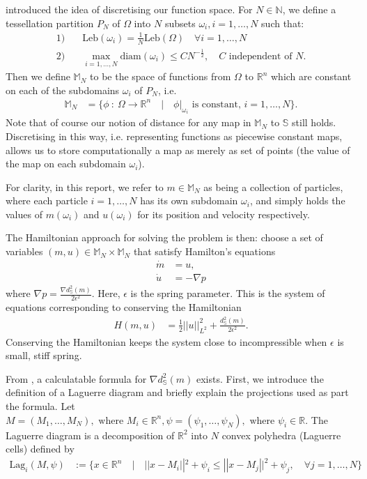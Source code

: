 \documentclass[11pt, oneside]{article}   	%
\newcommand{\R}{\mathbb{R}}
\newcommand{\MN}{\mathbb{M}_N}
\newcommand{\dsmsq}{d^{2}_{\mathbb{S}}(m)}
\newcommand{\graddsmsq}{\nabla{d^{2}_{\mathbb{S}}(m)}}
\newcommand{\N}{\mathbb{N}}
\newcommand{\Sb}{\mathbb{S}}
\newcommand{\Leb}{\mathrm{Leb}}
\begin{document}
\cite{gallouet2016lagrangian} introduced the idea of discretising our function space. For \(N \in \N\), we define a tessellation partition \(P_N\) of \(\Omega\) into \(N\) subsets \(\omega_i, i=1,\dots,N\) such that:
\begin{align}
1)& \quad \Leb(\omega_i) = \frac{1}{N}\Leb(\Omega) \quad \forall i = 1,\dots,N \\
2)& \quad \max_{i = 1,\dots,N} \mathrm{diam}(\omega_i) \le CN^{-\frac{1}{2}}, \quad C \text{ independent of } N.
\end{align}
Then we define \(\MN\) to be the space of functions from \(\Omega\) to \(\R^n\) which are constant on each of the subdomains \(\omega_i\) of \(P_N\), i.e.
\begin{align}
\MN &= \Big\{ \phi \: : \: \Omega \to \R^n \quad | \quad \phi | _{\omega_i} \text{ is constant, } i = 1,\dots,N \Big\}.
\end{align}
Note that of course our notion of distance for any map in \(\MN\) to \(\Sb\) still holds. Discretising in this way, i.e. representing functions as piecewise constant maps, allows us to store computationally a map as merely as set of points (the value of the map on each subdomain \(\omega_i\)).

For clarity, in this report, we refer to \(m \in \MN\)  as being a collection of particles, where each particle \(i=1,\dots,N\) has its own subdomain \(\omega_i\), and simply holds the values of \(m(\omega_i)\) and \(u(\omega_i)\) for its position and velocity respectively.

The Hamiltonian approach for solving the problem is then: choose a set of variables \((m, u) \in \MN \times \MN \) that satisfy Hamilton's equations
\begin{align} 
\dot{m} &= u, \\
\dot{u} &= - \nabla p
\end{align}
where \(\nabla p = \frac{\graddsmsq}{2\epsilon^2}\). Here, \(\epsilon\) is the spring parameter. This is the system of equations corresponding to conserving the Hamiltonian
\begin{align} 
H(m, u) &= \frac{1}{2} ||u||^2_{L^2} + \frac{\dsmsq}{2\epsilon^2}.
\end{align}
Conserving the Hamiltonian keeps the system close to incompressible when \(\epsilon\) is small,  stiff spring. 

From \cite{gallouet2016lagrangian}, a calculatable formula for \(\graddsmsq\) exists. First, we introduce the definition of a Laguerre diagram and briefly explain the projections used as part the formula. Let \(M = (M_1,\dots,M_N), \text{ where } M_i \in \R^n, \psi = (\psi_1,\dots,\psi_N), \text{ where } \psi_i \in \R\). The Laguerre diagram is a decomposition of \(\R^2\) into \(N\) convex polyhedra (Laguerre cells) defined by
\begin{align}
\mathrm{Lag}_i(M, \psi) &:= \Big\{ x \in \R^n \quad | \quad || x - M_i ||^2 + \psi_i \le || x - M_j ||^2 + \psi_j, \quad \forall j = 1,\dots,N \Big\}
\end{align}
\end{document}
